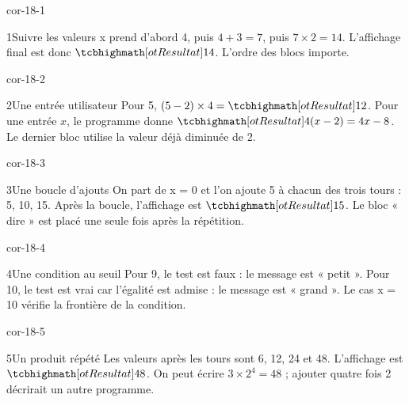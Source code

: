 \clearpage\pagestyle{otMain}\setlength{\otBlocEspacement}{2.5mm}\fontsize{11}{15}\selectfont{}
\begin{blocLivre}{cor-18-1}\begin{corrige}{1}{Suivre les valeurs}
x prend d’abord 4, puis $4+3=7$, puis $7\times2=14$. L’affichage final est donc $\res{14}$. L’ordre des blocs importe.
\label{fig-cor-18-1}
\end{corrige}\end{blocLivre}
\begin{blocLivre}{cor-18-2}\begin{corrige}{2}{Une entrée utilisateur}
Pour 5, $(5-2)\times4=\res{12}$. Pour une entrée $x$, le programme donne $\res{4(x-2)=4x-8}$. Le dernier bloc utilise la valeur déjà diminuée de 2.
\label{fig-cor-18-2}
\end{corrige}\end{blocLivre}
\begin{blocLivre}{cor-18-3}\begin{corrige}{3}{Une boucle d’ajouts}
On part de x = 0 et l’on ajoute 5 à chacun des trois tours : 5, 10, 15. Après la boucle, l’affichage est $\res{15}$. Le bloc « dire » est placé une seule fois après la répétition.
\label{fig-cor-18-3}
\end{corrige}\end{blocLivre}
\begin{blocLivre}{cor-18-4}\begin{corrige}{4}{Une condition au seuil}
Pour 9, le test est faux : le message est « petit ». Pour 10, le test est vrai car l’égalité est admise : le message est « grand ». Le cas x = 10 vérifie la frontière de la condition.
\label{fig-cor-18-4}
\end{corrige}\end{blocLivre}
\begin{blocLivre}{cor-18-5}\begin{corrige}{5}{Un produit répété}
Les valeurs après les tours sont 6, 12, 24 et 48. L’affichage est $\res{48}$. On peut écrire $3\times2^4=48$ ; ajouter quatre fois 2 décrirait un autre programme.
\label{fig-cor-18-5}
\end{corrige}\end{blocLivre}

